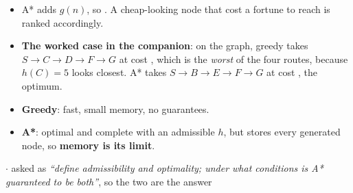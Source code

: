 {\begin{itemize}
        between two nodes that each look good from the other.
  \item A* adds $g(n)$, so . A cheap-looking node that cost a fortune to reach is
        ranked accordingly.
  \item \textbf{The worked case in the companion}: on the  graph,
        greedy takes $S \rightarrow C \rightarrow D \rightarrow F \rightarrow G$ at cost
        , which is the \emph{worst} of the four routes, because
        $h(C) = 5$ looks closest. A* takes $S \rightarrow B \rightarrow E \rightarrow F
        \rightarrow G$ at cost , the optimum.
\end{itemize}
\begin{itemize}
  \item \textbf{Greedy}: fast, small memory, no guarantees.
  \item \textbf{A*}: optimal and complete with an admissible $h$, but stores every
        generated node, so \textbf{memory is its limit}.
\end{itemize}}

\vspace{2pt}

{\color{sub}\footnotesize {}  \gap$\cdot$\gap
asked as \emph{``define admissibility and optimality; under what conditions is A*
guaranteed to be both''}, so the two  are the answer}

